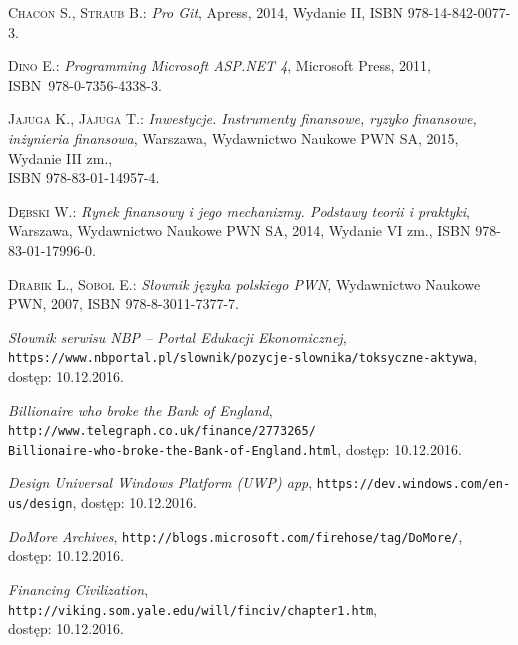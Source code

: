 \documentclass[a4paper,twoside,titlepage,openright]{book}
\begin{document}
\listoffigures


\begin{thebibliography}{99}

 \textsc{Chacon S., Straub B.:}
\textit{Pro Git}, Apress, 2014, Wydanie II, ISBN 978-14-842-0077-3.

 \textsc{Dino E.:}
\textit{Programming Microsoft ASP.NET 4}, Microsoft Press, 2011, \\ISBN~978-0-7356-4338-3.

 \textsc{Jajuga K., Jajuga T.:}
\textit{Inwestycje. Instrumenty finansowe, ryzyko finansowe, inżynieria finansowa}, Warszawa, Wydawnictwo Naukowe PWN SA, 2015, Wydanie III zm., \\ISBN 978-83-01-14957-4.

 \textsc{Dębski W.:}
\textit{Rynek finansowy i jego mechanizmy. Podstawy teorii i praktyki}, Warszawa, Wydawnictwo Naukowe PWN SA, 2014, Wydanie VI zm., ISBN 978-83-01-17996-0.

 \textsc{Drabik L., Sobol	E.:}
\textit{Słownik języka polskiego PWN}, Wydawnictwo Naukowe PWN, 2007, ISBN 978-8-3011-7377-7.

 \textit{Słownik serwisu NBP -- Portal Edukacji Ekonomicznej}, \\
\texttt{https://www.nbportal.pl/slownik/pozycje-slownika/toksyczne-aktywa}, \\dostęp: 10.12.2016.

 \textit{Billionaire who broke the Bank of England}, 
\texttt{http://www.telegraph.co.uk/finance/2773265/\\Billionaire-who-broke-the-Bank-of-England.html}, dostęp: 10.12.2016.

 \textit{Design Universal Windows Platform (UWP) app}, 
\texttt{https://dev.windows.com/en-us/design}, dostęp: 10.12.2016.

 \textit{DoMore Archives}, 
\texttt{http://blogs.microsoft.com/firehose/tag/DoMore/}, \\dostęp: 10.12.2016.

 \textit{Financing Civilization}, 
\texttt{http://viking.som.yale.edu/will/finciv/chapter1.htm}, \\dostęp: 10.12.2016.


\end{thebibliography}
\end{document}
